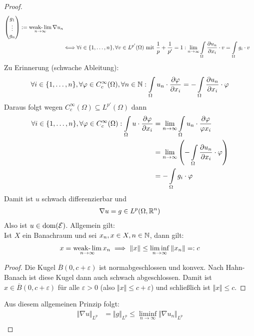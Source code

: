 \begin{beispiel}
\begin{proof}
\begin{align*}
\begin{pmatrix}
g_1\\ \vdots\\ g_n
\end{pmatrix}:=\operatorname*{\text{weak-}\lim}\limits_{n\to\infty}\nabla u_n\\
&\Longleftrightarrow\forall i\in\lbrace1,\ldots,n\rbrace,\forall v\in L^{p'}(\Omega)\text{ mit }\frac{1}{p}+\frac{1}{p'}=1:
\lim\limits_{n\to\infty}\int\limits_\Omega\frac{\partial u_n}{\partial x_i}\cdot v=\int\limits_\Omega g_i\cdot v
\end{align*}
Zu Erinnerung (schwache Ableitung):
\begin{align*}
\forall i\in\lbrace 1,\ldots,n\rbrace,\forall\varphi\in C_c^\infty(\Omega),\forall n\in\mathbb{N}:
\int\limits_\Omega u_n\cdot\frac{\partial\varphi}{\partial x_i}=-\int\limits_\Omega\frac{\partial u_n}{\partial x_i}\cdot\varphi
\end{align*}
Daraus folgt wegen $C_c^\infty(\Omega)\subseteq L^{p'}(\Omega)$ dann
\begin{align*}
\forall i\in\lbrace1,\ldots,n\rbrace,\forall\varphi\in C_c ^\infty(\Omega):
\int\limits_\Omega u\cdot\frac{\partial\varphi}{\partial x_i}
&=\lim\limits_{n\to\infty}\int\limits_\Omega u_n\cdot\frac{\partial\varphi}{\varphi x_i}\\
&=\lim\limits_{n\to\infty}\left(-\int\limits_\Omega\frac{\partial u_n}{\partial x_i}\cdot\varphi\right)\\
&=-\int\limits_\Omega g_i\cdot\varphi
\end{align*}
Damit ist $u$ schwach differenzierbar und 
\begin{align*}
\nabla u=g\in L^p(\Omega,\mathbb{R}^n)
\end{align*}
Also ist $u\in\text{dom}(\mathcal{E})$. Allgemein gilt:\\
Ist $X$ ein Banachraum und sei $x_n,x\in X,n\in\mathbb{N}$, dann gilt:
\begin{align*}
x=\operatorname*{\text{weak-}\lim}\limits_{n\to\infty} x_n\implies\Vert x\Vert\leq\liminf\limits_{n\to\infty}\Vert x_n\Vert=:c
\end{align*}
\begin{proof}
Die Kugel $\overline{B}(0,c+\varepsilon)$ ist normabgeschlossen und konvex. Nach Hahn-Banach ist diese Kugel dann auch schwach abgeschlossen.
Damit ist $x\in\overline{B}(0,c+\varepsilon)$ für alle $\varepsilon>0$ (also $\Vert x\Vert\leq c+\varepsilon$) und schließlich ist $\Vert x\Vert\leq c$.
\end{proof}
Aus diesem allgemeinen Prinzip folgt:
\begin{align*}
\Vert\nabla u\Vert_{L^p}&=\Vert g\Vert_{L^p}\leq\liminf\limits_{n\to\infty}\Vert \nabla u_n\Vert_{L^p}\\

\end{align*}
\end{proof}
\end{beispiel}
